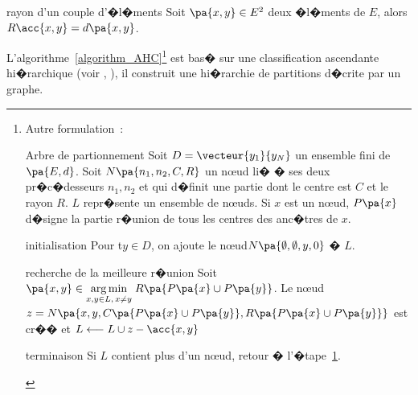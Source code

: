         \begin{xproperty}{rayon d'un couple d'�l�ments}\label{property_001}%
        Soit $\pa{x,y} \in E^2$ deux �l�ments de $E$, alors $R\acc{x,y} = d\pa{x,y}$.\\
        \end{xproperty}

L'algorithme~\ref{algorithm_AHC}\footnote{
Autre formulation~:

            \begin{xalgorithm}{Arbre de partionnement}
            \label{algorithm_AHC_prime}%
            Soit $D= \vecteur{y_1}{y_N}$ un ensemble fini de $\pa{E,d}$. Soit $N\pa{n_1,n_2,C,R}$ un n\oe ud 
            li� � ses deux pr�c�desseurs $n_1,n_2$ et qui d�finit une partie dont le centre est $C$ et le rayon $R$. 
            $L$ repr�sente un ensemble de n\oe uds. Si $x$ est un n\oe ud, $P\pa{x}$ d�signe la partie r�union 
            de tous les centres des anc�tres de $x$.
            
            \begin{xalgostep}{initialisation}
                Pour t$ y \in D$, on ajoute le n\oe ud$N\pa{ \emptyset,\emptyset,y,0}$ � $L$.
            \end{xalgostep}
                
            \begin{xalgostep}{recherche de la meilleure r�union}\label{space_metric_step_cah_cah_2}
                Soit $\pa{x,y} \in \underset{ x,y \in L, \, x \neq y }
                                                                                {\arg \min} \; R\pa{ P\pa{x} \cup P\pa{y} }$.
                Le n\oe ud \\
                                                    $    z =         N\pa{    x,y, 
                                                                    C\pa{ P\pa{x} \cup P\pa{y} } , 
                                                                    R\pa{ P\pa{x} \cup P\pa{y} } }$ est cr�� et 
                $L \longleftarrow L \cup {z} - \acc{x,y}$
            \end{xalgostep}
                
            \begin{xalgostep}{terminaison}
                    Si $L$ contient plus d'un n\oe ud, retour � l'�tape~\ref{space_metric_step_cah_cah_2}.
            \end{xalgostep}
            \end{xalgorithm}
} est bas� sur une classification ascendante hi�rarchique (voir , ), il construit une hi�rarchie de partitions d�crite par un graphe. 





